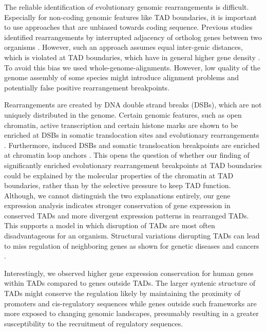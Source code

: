 \documentclass[a4paper,twoside=true,openright,parskip=full,chapterprefix=true,11pt,headings=normal,bibliography=totoc,listof=totoc,titlepage=on,captions=tableabove,draft=false]{scrreprt}
\theoremstyle{definition}
\theoremstyle{definition}
\theoremstyle{definition}
\theoremstyle{remark}
\begin{document}
The reliable identification of evolutionary genomic rearrangements is
difficult. Especially for non-coding genomic features like TAD
boundaries, it is important to use approaches that are unbiased towards
coding sequence. Previous studies identified rearrangements by
interrupted adjacency of ortholog genes between two organisms
\citep{VietriRudan2015, Pevzner2003}. However, such an approach assumes
equal inter-genic distances, which is violated at TAD boundaries, which
have in general higher gene density \citep{Dixon2012, Hou2012}. To avoid
this bias we used whole-genome-alignments. However, low quality of the
genome assembly of some species might introduce alignment problems and
potentially false positive rearrangement breakpoints.

Rearrangements are created by DNA double strand breaks (DSBs), which are
not uniquely distributed in the genome. Certain genomic features, such
as open chromatin, active transcription and certain histone marks are
shown to be enriched at DSBs in somatic translocation sites
\citep{Roukos2014} and evolutionary rearrangements
\citep{Murphy2005, Hinsch2006}. Furthermore, induced DSBs and somatic
translocation breakpoints are enriched at chromatin loop anchors
\citep{Canela2017}. This opens the question of whether our finding of
significantly enriched evolutionary rearrangement breakpoints at TAD
boundaries could be explained by the molecular properties of the
chromatin at TAD boundaries, rather than by the selective pressure to
keep TAD function. Although, we cannot distinguish the two explanations
entirely, our gene expression analysis indicates stronger conservation
of gene expression in conserved TADs and more divergent expression
patterns in rearranged TADs. This supports a model in which disruption
of TADs are most often disadvantageous for an organism. Structural
variations disrupting TADs can lead to miss regulation of neighboring
genes as shown for genetic diseases
\citep{Ibn-Salem2014, Lupianez2015, Redin2016, Franke2016} and cancers
\citep{Hnisz2016, Northcott2014, Weischenfeldt2016}.

Interestingly, we observed higher gene expression conservation for human
genes within TADs compared to genes outside TADs. The larger syntenic
structure of TADs might conserve the regulation likely by maintaining
the proximity of promoters and cis-regulatory sequences while genes
outside such frameworks are more exposed to changing genomic landscapes,
presumably resulting in a greater susceptibility to the recruitment of
regulatory sequences.
\end{document}
